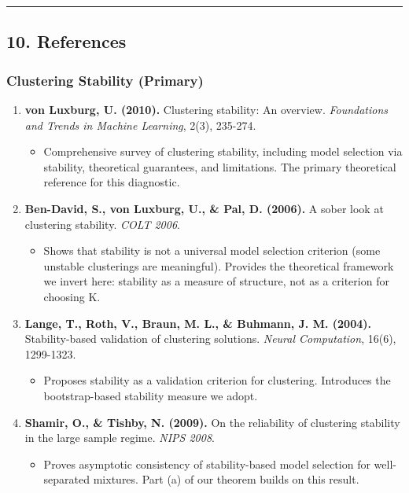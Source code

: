 \documentclass[
  12pt,
]{ctexart}
\providecommand{\tightlist}{%
  \setlength{\itemsep}{0pt}\setlength{\parskip}{0pt}}
\begin{document}
\begin{center}\rule{0.5\linewidth}{0.5pt}\end{center}

\subsection{10. References}\label{references}

\subsubsection{Clustering Stability
(Primary)}\label{clustering-stability-primary}

\begin{enumerate}
\def\labelenumi{\arabic{enumi}.}
\tightlist
\item
  \textbf{von Luxburg, U. (2010).} Clustering stability: An overview.
  \emph{Foundations and Trends in Machine Learning}, 2(3), 235-274.

  \begin{itemize}
  \tightlist
  \item
    Comprehensive survey of clustering stability, including model
    selection via stability, theoretical guarantees, and limitations.
    The primary theoretical reference for this diagnostic.
  \end{itemize}
\item
  \textbf{Ben-David, S., von Luxburg, U., \& Pal, D. (2006).} A sober
  look at clustering stability. \emph{COLT 2006}.

  \begin{itemize}
  \tightlist
  \item
    Shows that stability is not a universal model selection criterion
    (some unstable clusterings are meaningful). Provides the theoretical
    framework we invert here: stability as a measure of structure, not
    as a criterion for choosing K.
  \end{itemize}
\item
  \textbf{Lange, T., Roth, V., Braun, M. L., \& Buhmann, J. M. (2004).}
  Stability-based validation of clustering solutions. \emph{Neural
  Computation}, 16(6), 1299-1323.

  \begin{itemize}
  \tightlist
  \item
    Proposes stability as a validation criterion for clustering.
    Introduces the bootstrap-based stability measure we adopt.
  \end{itemize}
\item
  \textbf{Shamir, O., \& Tishby, N. (2009).} On the reliability of
  clustering stability in the large sample regime. \emph{NIPS 2008}.

  \begin{itemize}
  \tightlist
  \item
    Proves asymptotic consistency of stability-based model selection for
    well-separated mixtures. Part (a) of our theorem builds on this
    result.
  \end{itemize}
\end{enumerate}
\end{document}
